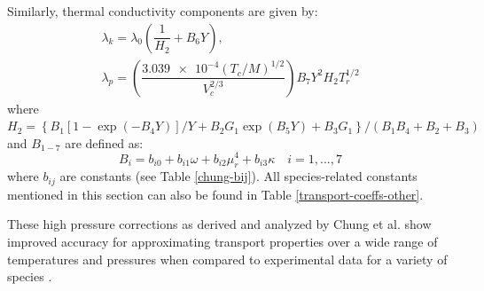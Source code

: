 Similarly, thermal conductivity components are given by: 
\begin{equation}
\begin{split}
\lambda_k = \lambda_0 \left( \dfrac{1}{H_2} + B_6 Y \right), \\ 
\lambda_p = \left(\dfrac{\num{3.039e-4}(T_c/M)^{1/2}}{V_c^{2/3}}\right)B_7Y^2H_2T_r^{1/2} 
\end{split}
\end{equation}
where $H_2 = \left\{B_1\left[   1-\exp(-B_4Y)\right]/Y + B_2G_1\exp(B_5Y) + B_3G_1 \right\}/(B_1B_4 + B_2 + B_3)$ and $B_{1-7}$ are defined as: 
\begin{equation}
B_i = b_{i0} + b_{i1} \omega + b_{i2} \mu_r^4 + b_{i3} \kappa \quad i = 1,..., 7
\end{equation}
where $b_{ij}$ are constants (see Table \ref{chung-bij}). All species-related constants mentioned in this section can also be found in Table \ref{transport-coeffs-other}. 

These high pressure corrections as derived and analyzed by Chung et al. show improved accuracy for approximating transport properties over a wide range of temperatures and pressures when compared to experimental data for a variety of species \cite{chung:1988}. 

